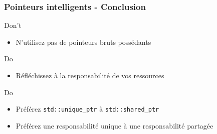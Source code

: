 \documentclass[C++.tex]{subfiles}
\begin{document}
\begin{frame}[fragile]
	\frametitle{Pointeurs intelligents - Conclusion}
	\begin{alertblock}{Don't}
		\begin{itemize}
			\item N'utilisez pas de pointeurs bruts possédants
		\end{itemize}
	\end{alertblock}

	\begin{exampleblock}{Do}
		\begin{itemize}
			\item Réfléchissez à la responsabilité de vos ressources
		\end{itemize}
	\end{exampleblock}

	\begin{exampleblock}{Do}
		\begin{itemize}
			\item Préférez \lstinline|std::unique_ptr| à \lstinline|std::shared_ptr|
			\item Préférez une responsabilité unique à une responsabilité partagée

		\end{itemize}
	\end{exampleblock}
\end{frame}
\end{document}
